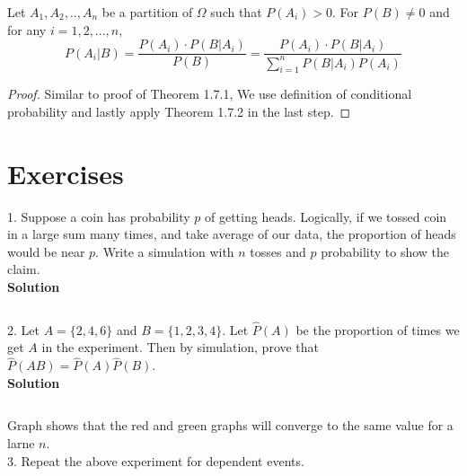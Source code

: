 \begin{theorem} Let $A_1,A_2,..,A_n$ be a partition of $\Omega$ such that $P(A_i) > 0$. For $P(B) \neq 0$ and for any $i=1,2,...,n$,
    $$ P(A_i|B) = \frac{P(A_i) \cdot P(B|A_i)}{P(B)} =  \frac{P(A_i) \cdot P(B|A_i)}{\sum_{i=1}^n P(B|A_i)P(A_i) }$$
\end{theorem}
\begin{proof}
    Similar to proof of Theorem 1.7.1, We use definition of conditional probability and  lastly apply Theorem 1.7.2  in the last step.
\end{proof}

\section{Exercises}

     1. Suppose a coin has probability  $p$ of getting heads. Logically, if we tossed coin in a large sum many times, and take average of our data, the proportion of heads would be near $p$. Write a simulation with $n$ tosses and $p$ probability to show the claim. \\
    \textbf{Solution}      

    \inputminted{python}{src/chapter1/1.py} 
    \begin{center}  \end{center}

    2. Let  $ A = \{2, 4, 6\}$ and $B = \{ 1, 2, 3, 4 \}$. Let $\widehat{P}(A)$ be the proportion of times we get $A$ in the experiment. Then by simulation, prove that $\widehat{P}(AB) = \widehat{P}(A)\widehat{P}(B)$.\\
    \textbf{Solution} 

    \inputminted{python}{src/chapter1/2.py}
    \begin{center}  \end{center}

    Graph shows that  the red and green graphs will converge to the same value for a larne $n$.\\

    3. Repeat the above experiment for dependent events.



